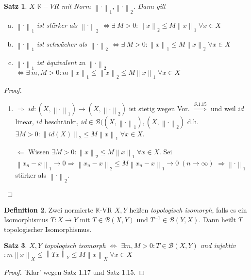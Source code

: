 \documentclass[ngerman]{report}
\theoremstyle{plain}%
\newtheorem{thm}{Satz}[chapter]
\theoremstyle{definition}%
\newtheorem{definition}[thm]{Definition}
\theoremstyle{myStyle}
\newcommand{\K}{\mathbb{K}}
\newcommand{\B}{\mathcal{B}} %
\newcommand{\BS}[1][X,Y]{\mathcal{B}(#1)} %
\newcommand{\norm}[1]{\left \|#1\right\| }
\newcommand{\df}[1][]{%
	\overset{#1}{\Rightarrow}
}
\newcommand{\aq}{\Leftrightarrow} %
\newcommand{\inv}[1]{#1^{-1}}
\newcommand{\qmarks}[1]{#1}
\begin{document}
	\begin{thm}
		$X$ $\K-VR$ mit Norm $\norm{\cdot}_1$,$\norm{\cdot}_2$. Dann gilt 
			\begin{enumerate}[(a)]
				\item $\norm{\cdot}_1$ ist stärker als $\norm{\cdot}_2$ 
					$\aq \exists \: M > 0: \norm{x}_2 \leq M \norm{x}_1 \; \forall x\in X$
				\item $\norm{\cdot}_1$ ist schwächer als $\norm{\cdot}_2$ 
					$\aq \exists \: M > 0: \norm{x}_1 \leq M \norm{x}_2 \; \forall x\in X$
				\item $\norm{\cdot}_1$ ist äquivalent zu $\norm{\cdot}_2$ 
					$\aq \exists \: m,M > 0: m\norm{x}_1 \leq \norm{x}_2 \leq M \norm{x}_1 \; \forall x\in X$
			\end{enumerate}
	\end{thm}

	\begin{proof}
		\begin{enumerate}[zu (a):]
	 		\item \qmarks{$\df$} $id : (X,\norm{\cdot}_1) \to (X,\norm{\cdot}_2)$ ist stetig wegen Vor.
				$\df[S.1.15]$ und weil $id$ linear, $id$ beschränkt, 
				$id\in \B((X,\norm{\cdot}_1), (X,\norm{\cdot}_2)$ d.h. 
				$\exists M > 0: \norm{id(X)}_2 \leq M \norm{x}_1 \; \forall x\in X$.\par
			\qmarks{$\Leftarrow$}	Wissen $\exists M>0: \norm{x}_2 \leq M\norm{x}_1 \; \forall x\in X$.
			Sei $\norm{x_n - x}_1 \to 0 \df \norm{x_n - x}_2 \leq M\norm{x_n - x}_1 \to 0 \; (n\to\infty)$
			$\df \norm{\cdot}_1$ stärker als $\norm{\cdot}_2$.
	 	\end{enumerate}
	\end{proof}

	\begin{definition}
		Zwei normierte $\K$-VR $X,Y$ heißen \textit{topologisch isomorph}, falls es ein Isomorphismus 
		$T: X\to Y$ mit $T\in \BS$ und $\inv{T}\in\B(Y,X)$. Dann heißt $T$ topologischer Isomorphismus.
	\end{definition}

	\begin{thm}
		$X, Y$ topologisch isomorph $\aq$ $\exists m,M > 0: T\in \BS$ und injektiv
		$: m\norm{x}_X \leq \norm{Tx}_Y \leq M \norm{x}_X \; \forall x\in X$
	\end{thm}
	\begin{proof}
		'Klar' wegen Satz 1.17 und Satz 1.15.
	\end{proof}
	
\end{document}
